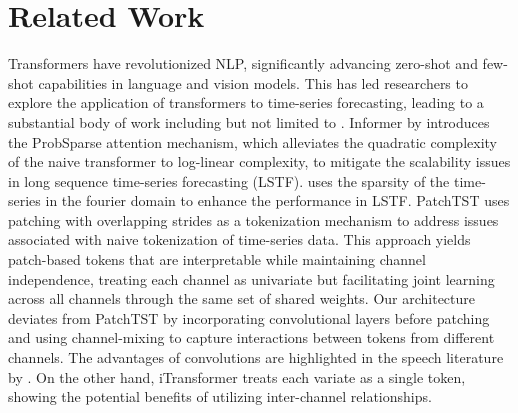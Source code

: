 \section{Related Work}
\label{sec:related}



Transformers \cite{attention_is_all_you_need} have revolutionized NLP, significantly advancing zero-shot and few-shot capabilities in language and vision models. This has led researchers to explore the application of transformers to time-series forecasting, leading to a substantial body of work including but not limited to \cite{ haoyietal-informer-2021, wu2021autoformer, zhou2022fedformer,logtrans, Yuqietal-2023-PatchTST, liu2022pyraformer, zhang2023crossformer}.  Informer by \cite{liu2023itransformer} introduces the ProbSparse attention mechanism, which alleviates the quadratic complexity of the naive transformer to log-linear complexity, to mitigate the scalability issues in long sequence time-series forecasting (LSTF). \cite{zhou2022fedformer} uses the sparsity of the time-series in the fourier domain to enhance the performance in LSTF. PatchTST \cite{Yuqietal-2023-PatchTST} uses patching with overlapping strides as a tokenization mechanism to address issues associated with naive tokenization of time-series data. This approach yields patch-based tokens that are interpretable while maintaining channel independence, treating each channel as univariate but facilitating joint learning across all channels through the same set of shared weights. Our architecture deviates from PatchTST by incorporating convolutional layers before patching and using channel-mixing to capture interactions between tokens from different channels. The advantages of convolutions are highlighted in the speech literature by \cite{wav2vec,hsu_conv}. On the other hand, iTransformer \cite{liu2023itransformer} treats each variate as a single token, showing the potential benefits of utilizing inter-channel relationships.


